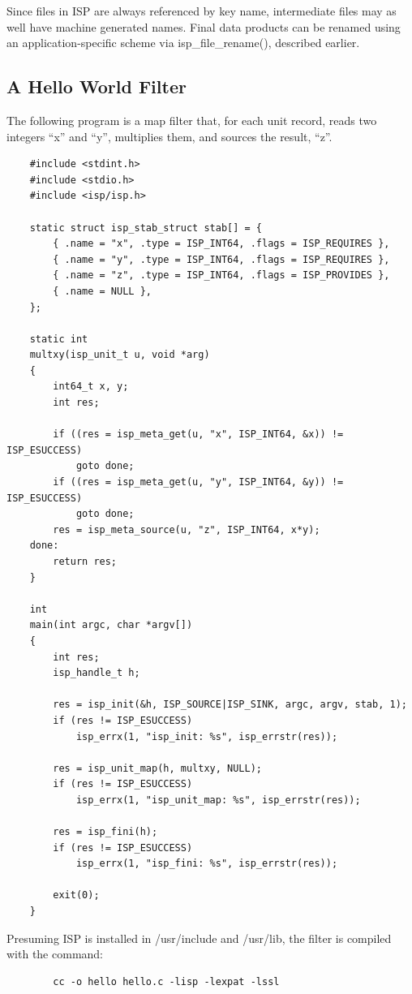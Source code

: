 \documentclass{article}
\begin{document}
Since files in ISP are always referenced by key name, intermediate files
may as well have machine generated names.  Final data products can be renamed
using an application-specific scheme via isp\_file\_rename(), described
earlier.


\subsection{A Hello World Filter}\label{sechello}

The following program is a map filter that, for each unit record,
reads two integers ``x'' and ``y'', multiplies them, and sources the 
result, ``z''.

\begin{verbatim}
    #include <stdint.h>
    #include <stdio.h>
    #include <isp/isp.h>
    
    static struct isp_stab_struct stab[] = {
        { .name = "x", .type = ISP_INT64, .flags = ISP_REQUIRES },
        { .name = "y", .type = ISP_INT64, .flags = ISP_REQUIRES },
        { .name = "z", .type = ISP_INT64, .flags = ISP_PROVIDES },
        { .name = NULL },
    };
    
    static int
    multxy(isp_unit_t u, void *arg)
    {
        int64_t x, y;
        int res;
    
        if ((res = isp_meta_get(u, "x", ISP_INT64, &x)) != ISP_ESUCCESS)
            goto done;
        if ((res = isp_meta_get(u, "y", ISP_INT64, &y)) != ISP_ESUCCESS)
            goto done;
        res = isp_meta_source(u, "z", ISP_INT64, x*y);
    done:
        return res;
    }
    
    int
    main(int argc, char *argv[])
    {
        int res;
        isp_handle_t h;
    
        res = isp_init(&h, ISP_SOURCE|ISP_SINK, argc, argv, stab, 1);
        if (res != ISP_ESUCCESS)
            isp_errx(1, "isp_init: %s", isp_errstr(res));
    
        res = isp_unit_map(h, multxy, NULL);
        if (res != ISP_ESUCCESS)
            isp_errx(1, "isp_unit_map: %s", isp_errstr(res));
    
        res = isp_fini(h);
        if (res != ISP_ESUCCESS)
            isp_errx(1, "isp_fini: %s", isp_errstr(res));
    
        exit(0);
    }
\end{verbatim}

Presuming ISP is installed in /usr/include and /usr/lib, the filter is 
compiled with the command:
\begin{verbatim}
        cc -o hello hello.c -lisp -lexpat -lssl
\end{verbatim}
\end{document}
